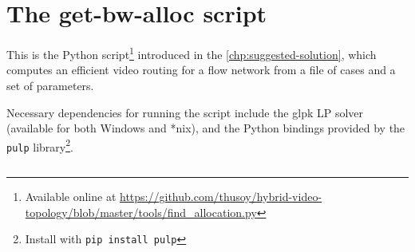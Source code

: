 \chapter{The get-bw-alloc script}
\label{chp:get-bw-alloc}

This is the Python script\footnote{Available online at \url{https://github.com/thusoy/hybrid-video-topology/blob/master/tools/find_allocation.py}} introduced in the \autoref{chp:suggested-solution}, which computes an efficient video routing for a flow network from a file of cases and a set of parameters.

Necessary dependencies for running the script include the glpk LP solver (available for both Windows and *nix), and the Python bindings provided by the \texttt{pulp} library\footnote{Install with \texttt{pip install pulp}}.

\inputminted[linenos,
               numbersep=5pt,
               frame=lines,
               framesep=2mm]{python}{tools/find_allocation.py}
